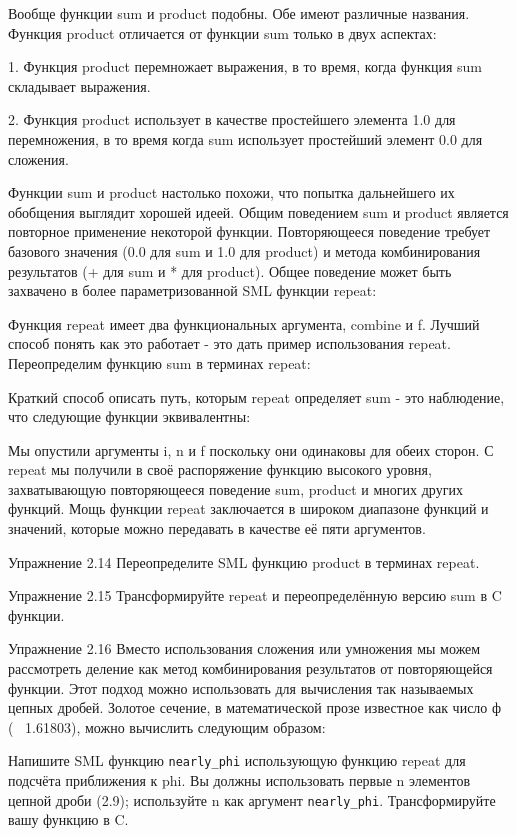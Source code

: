 Вообще функции sum и product подобны. Обе имеют различные названия. Функция product отличается от функции sum только в двух аспектах:

1. Функция product перемножает выражения, в то время, когда функция sum складывает выражения.

2. Функция product использует в качестве простейшего элемента 1.0 для перемножения, в то время когда sum использует простейший элемент 0.0 для сложения.

Функции sum и product настолько похожи, что попытка дальнейшего их обобщения выглядит хорошей идеей. Общим поведением sum и product является повторное применение некоторой функции. Повторяющееся поведение требует базового значения (0.0 для sum и 1.0 для product) и метода комбинирования результатов (+ для sum и * для product). Общее поведение может быть захвачено в более параметризованной SML функции repeat:

Функция repeat имеет два функциональных аргумента, combine и f. Лучший способ понять как это работает - это дать пример использования repeat. Переопределим функцию sum в терминах repeat:

Краткий способ описать путь, которым repeat определяет sum - это наблюдение, что следующие функции эквивалентны:

Мы опустили аргументы i, n и f поскольку они одинаковы для обеих сторон. С repeat мы получили в своё распоряжение функцию высокого уровня, захватывающую повторяющееся поведение sum, product и многих других функций. Мощь функции repeat заключается в широком диапазоне функций и значений, которые можно передавать в качестве её пяти аргументов.

Упражнение 2.14 Переопределите SML функцию product в терминах repeat.

Упражнение 2.15 Трансформируйте repeat и переопределённую версию sum в C функции.

Упражнение 2.16 Вместо использования сложения или умножения мы можем рассмотреть деление как метод комбинирования результатов от повторяющейся функции. Этот подход можно использовать для вычисления так называемых цепных дробей. Золотое сечение, в математической прозе известное как число ф (~ 1.61803), можно вычислить следующим образом:

Напишите SML функцию \lstinline|nearly_phi| использующую функцию repeat для подсчёта приближения к phi. Вы должны использовать первые n элементов цепной дроби (2.9); используйте n как аргумент \lstinline|nearly_phi|. Трансформируйте вашу функцию в C.

